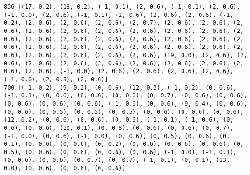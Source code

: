 \documentclass[11pt]{article}
\begin{document}
\begin{Verbatim}[commandchars=\\\{\}]
836 [(17, 0.2), (18, 0.2), (-1, 0.1), (2, 0.6), (-1, 0.1), (2, 0.6), (-1, 0.0), (2, 0.6), (-1, 0.1), (2, 0.6), (2, 0.6), (2, 0.6), (-1, 0.2), (2, 0.6), (2, 0.6), (2, 0.6), (2, 0.7), (2, 0.6), (2, 0.6), (2, 0.6), (2, 0.6), (2, 0.6), (2, 0.6), (2, 0.6), (2, 0.6), (2, 0.6), (2, 0.6), (2, 0.6), (2, 0.6), (2, 0.6), (2, 0.6), (2, 0.6), (2, 0.6), (2, 0.6), (2, 0.6), (2, 0.6), (2, 0.6), (2, 0.6), (2, 0.6), (2, 0.6), (2, 0.6), (2, 0.6), (2, 0.6), (2, 0.6), (2, 0.6), (19, 0.0), (2, 0.6), (2, 0.6), (2, 0.6), (2, 0.6), (2, 0.6), (2, 0.6), (2, 0.6), (2, 0.6), (2, 0.6), (2, 0.6), (-1, 0.0), (2, 0.6), (2, 0.6), (2, 0.6), (2, 0.6), (-1, 0.0), (2, 0.5), (2, 0.6)]
700 [(-1, 0.2), (9, 0.2), (0, 0.6), (12, 0.3), (-1, 0.2), (0, 0.6), (-1, 0.1), (0, 0.6), (0, 0.6), (0, 0.6), (0, 0.7), (0, 0.6), (0, 0.6), (0, 0.6), (0, 0.6), (0, 0.6), (-1, 0.0), (0, 0.6), (9, 0.4), (0, 0.6), (0, 0.6), (0, 0.5), (0, 0.5), (0, 0.5), (0, 0.6), (0, 0.6), (0, 0.6), (12, 0.2), (0, 0.6), (0, 0.6), (0, 0.6), (-1, 0.1), (-1, 0.6), (0, 0.6), (0, 0.6), (10, 0.1), (0, 0.8), (0, 0.6), (0, 0.6), (0, 0.7), (-1, 0.0), (0, 0.6), (-1, 0.0), (0, 0.6), (0, 0.5), (0, 0.6), (0, 0.1), (0, 0.6), (0, 0.6), (0, 0.2), (0, 0.6), (0, 0.6), (0, 0.6), (0, 0.5), (0, 0.6), (0, 0.6), (0, 0.6), (0, 0.6), (-1, 0.0), (-1, 0.1), (0, 0.6), (0, 0.6), (0, 0.7), (0, 0.7), (-1, 0.1), (0, 0.1), (13, 0.0), (0, 0.6), (0, 0.6), (0, 0.6)]

\end{Verbatim}
\end{document}
